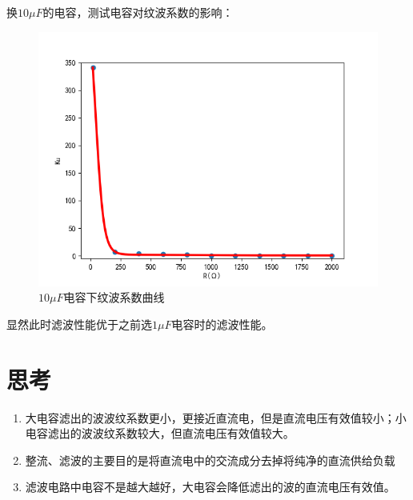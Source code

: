\documentclass[UTF8]{ctexart}
\begin{document}
\newline
换$10\mu F$的电容，测试电容对纹波系数的影响：
\begin{figure}[h!]
    \centering
    \includegraphics[scale=0.7]{电容对纹波系数的影响.png}
    \caption{$10\mu F$电容下纹波系数曲线}
\end{figure}
\newline
显然此时滤波性能优于之前选$1\mu F$电容时的滤波性能。
\newpage
\section{思考}
\begin{enumerate}
    \item 大电容滤出的波波纹系数更小，更接近直流电，但是直流电压有效值较小；小电容滤出的波波纹系数较大，但直流电压有效值较大。
    \item 整流、滤波的主要目的是将直流电中的交流成分去掉将纯净的直流供给负载
    \item 滤波电路中电容不是越大越好，大电容会降低滤出的波的直流电压有效值。
\end{enumerate}
\end{document}
